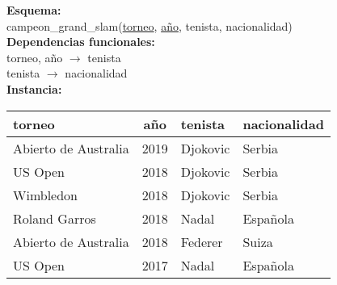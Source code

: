 \documentclass[preview]{standalone}
\begin{document}
\textbf{Esquema:}\\
campeon\_grand\_slam(\underline{torneo}, \underline{a\~no}, tenista, nacionalidad)\\
  
\textbf{Dependencias funcionales:}\\
torneo, a\~no $\rightarrow$ tenista\\
tenista $\rightarrow$ nacionalidad\\
  
\textbf{Instancia:}
\begin{center}
\begin{tabular}{| l | c | l | l |}\hline			
	torneo & a\~no & tenista & nacionalidad  \\\hline			
	Abierto de Australia & 2019 & Djokovic & Serbia \\
	US Open & 2018 & Djokovic & Serbia \\
	Wimbledon & 2018 & Djokovic & Serbia \\
	Roland Garros & 2018 & Nadal & Espa\~nola \\
	Abierto de Australia & 2018 & Federer & Suiza \\
	US Open & 2017 & Nadal & Espa\~nola \\\hline
\end{tabular}
\end{center}
\end{document}
